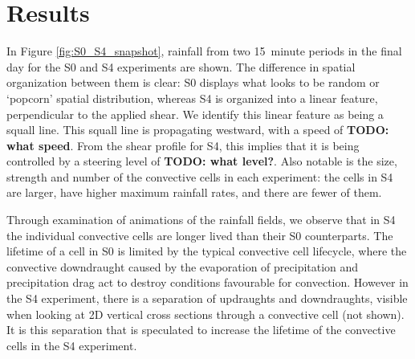 \documentclass[11pt,a4paper]{article}
\newcommand\todo[1]{\textbf{TODO: #1}}
\begin{document}
\section{Results}

%

%
In Figure \ref{fig:S0_S4_snapshot}, rainfall from two \SI{15}{minute} periods in the final day for the S0 and S4 experiments are shown. The difference in spatial organization between them is clear: S0 displays what looks to be random or `popcorn' spatial distribution, whereas S4 is organized into a linear feature, perpendicular to the applied shear. We identify this linear feature as being a squall line. This squall line is propagating westward, with a speed of \todo{what speed}. From the shear profile for S4, this implies that it is being controlled by a steering level of \todo{what level?}. Also notable is the size, strength and number of the convective cells in each experiment: the cells in S4 are larger, have higher maximum rainfall rates, and there are fewer of them. 

Through examination of animations of the rainfall fields, we observe that in S4 the individual convective cells are longer lived than their S0 counterparts. The lifetime of a cell in S0 is limited by the typical convective cell lifecycle, where the convective downdraught caused by the evaporation of precipitation and precipitation drag act to destroy conditions favourable for convection. However in the S4 experiment, there is a separation of updraughts and downdraughts, visible when looking at 2D vertical cross sections through a convective cell (not shown). It is this separation that is speculated to increase the lifetime of the convective cells in the S4 experiment.
\end{document}
